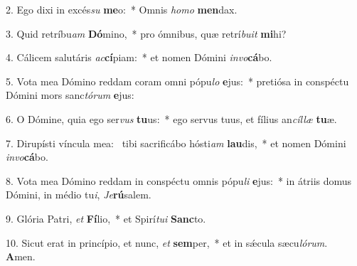 2. Ego dixi in excés\textit{su} \textbf{me}o:~*  Omnis \textit{ho}\textit{mo} \textbf{men}dax.\

3. Quid retríbu\textit{am} \textbf{Dó}mino,~*  pro ómnibus, quæ retrí\textit{bu}\textit{it} \textbf{mi}hi?\

4. Cálicem salutáris \textit{ac}\textbf{cí}piam:~*  et nomen Dómini \textit{in}\textit{vo}\textbf{cá}bo.\

5. Vota mea Dómino reddam coram omni pópu\textit{lo} \textbf{e}jus:~*  pretiósa in conspéctu Dómini mors sanc\textit{tó}\textit{rum} \textbf{e}jus:\

6. O Dómine, quia ego ser\textit{vus} \textbf{tu}us:~*  ego servus tuus, et fílius an\textit{cíl}\textit{læ} \textbf{tu}æ.\

7. Dirupísti víncula mea: \dag\  tibi sacrificábo hósti\textit{am} \textbf{lau}dis,~*  et nomen Dómini \textit{in}\textit{vo}\textbf{cá}bo.\

8. Vota mea Dómino reddam in conspéctu omnis pópu\textit{li} \textbf{e}jus:~*  in átriis domus Dómini, in médio tu\textit{i}, \textit{Je}\textbf{rú}salem.\

9. Glória Patri, \textit{et} \textbf{Fí}lio,~*  et Spirí\textit{tu}\textit{i} \textbf{Sanc}to.\

10. Sicut erat in princípio, et nunc, \textit{et} \textbf{sem}per,~*  et in sǽcula sæcu\textit{ló}\textit{rum}. \textbf{A}men.\

